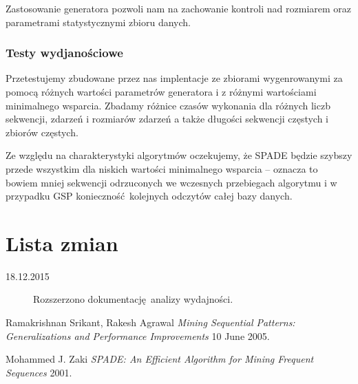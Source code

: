 \documentclass[paper=a4, fontsize=11pt]{scrartcl} %
\numberwithin{equation}{section} %
\numberwithin{figure}{section} %
\numberwithin{table}{section} %
\begin{document}
Zastosowanie generatora pozwoli nam na zachowanie kontroli nad rozmiarem
oraz parametrami statystycznymi zbioru danych.

\subsubsection{Testy wydjanościowe}
Przetestujemy zbudowane przez nas implentacje ze zbiorami wygenrowanymi
za pomocą różnych wartości parametrów generatora i z różnymi wartościami minimalnego
wsparcia.  Zbadamy różnice czasów wykonania dla różnych liczb sekwencji,
zdarzeń i rozmiarów zdarzeń a także długości sekwencji częstych i zbiorów
częstych.

Ze względu na charakterystyki algorytmów oczekujemy, że SPADE będzie szybszy
przede wszystkim dla niskich wartości minimalnego wsparcia -- oznacza to
bowiem mniej sekwencji odrzuconych we wczesnych przebiegach algorytmu
i w przypadku GSP konieczność kolejnych odczytów całej bazy danych.

\appendix
\section{Lista zmian}

\begin{description}
    \item[18.12.2015] Rozszerzono dokumentację analizy wydajności.
\end{description}


\renewcommand{\refname}{Bibliografia}

  \begin{thebibliography}{1}

   Ramakrishnan Srikant, Rakesh Agrawal {\em Mining Sequential Patterns: Generalizations and Performance Improvements} 10 June 2005.

   Mohammed J. Zaki {\em SPADE: An Efficient Algorithm for Mining Frequent Sequences} 2001.

  \end{thebibliography}
\end{document}
